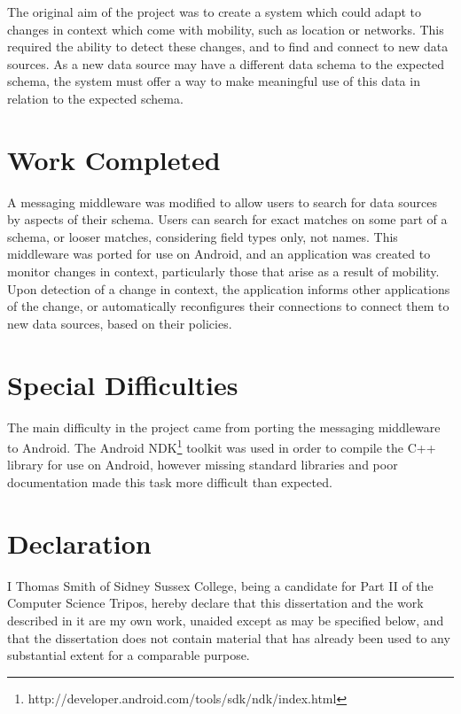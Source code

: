 \documentclass[12pt,twoside,notitlepage]{report}
\begin{document}
The original aim of the project was to create a system which could adapt to changes in context which come with mobility, such as location or networks. 
This required the ability to detect these changes, and to find and connect to new data sources. 
As a new data source may have a different data schema to the expected schema, the system must offer a way to make meaningful use of this data in relation to the expected schema.

\section*{Work Completed}

A messaging middleware was modified to allow users to search for data sources by aspects of their schema. Users can search for exact matches on some part of a schema, or looser matches, considering field types only, not names.
This middleware was ported for use on Android, and an application was created to monitor changes in context, particularly those that arise as a result of mobility. Upon detection of a change in context, the application informs other applications of the change, or automatically reconfigures their connections to connect them to new data sources, based on their policies.

\section*{Special Difficulties}

The main difficulty in the project came from porting the messaging middleware to Android. The Android NDK\footnote{http://developer.android.com/tools/sdk/ndk/index.html} toolkit was used in order to compile the C++ library for use on Android, however missing standard libraries and poor documentation made this task more difficult than expected.
 
\newpage
\section*{Declaration}

I Thomas Smith of Sidney Sussex College, being a candidate for Part II of the Computer
Science Tripos, hereby declare that this dissertation and the work described in it are my own work,
unaided except as may be specified below, and that the dissertation
does not contain material that has already been used to any substantial
extent for a comparable purpose.

\bigskip
\bigskip
{}
\end{document}
